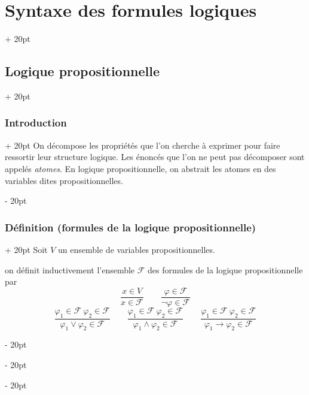 \documentclass[a4paper, 12pt, twoside]{article}
\newcommand{\ind}[1][20pt]{\advance\leftskip + #1}
\newcommand{\deind}[1][20pt]{\advance\leftskip - #1}
\newenvironment{indt}[2][20pt]{#2 \par \ind[#1]}{\par \deind} %
\begin{document}
    \begin{indt}{\section{Syntaxe des formules logiques}}
        
        \begin{indt}{\subsection{Logique propositionnelle}}
            \begin{indt}{\subsubsection{Introduction}}
                On décompose les propriétés que l'on cherche à exprimer pour faire ressortir leur structure logique. Les énoncés que l'on ne peut pas décomposer sont appelés \textit{atomes}. En logique propositionnelle, on abstrait les atomes en des variables dites propositionnelles.
            \end{indt}
            
            \vspace{12pt}
            
            \begin{indt}{\subsubsection{Définition (formules de la logique propositionnelle)}}
                Soit $V$ un ensemble de variables propositionnelles.
                
                on définit inductivement l'ensemble $\mathcal F$ des formules de la logique propositionnelle par
                    \[
                        \dfrac{x \in V}{x \in \mathcal F}
                        \qquad
                        \dfrac{\varphi \in \mathcal F}{\neg \varphi \in \mathcal F}
                    \]
                    \[
                        \dfrac{\varphi_1 \in \mathcal F\ \varphi_2 \in \mathcal F}{\varphi_1 \vee \varphi_2 \in \mathcal F}
                        \qquad
                        \dfrac{\varphi_1 \in \mathcal F\ \varphi_2 \in \mathcal F}{\varphi_1 \wedge \varphi_2 \in \mathcal F}
                        \qquad
                        \dfrac{\varphi_1 \in \mathcal F\ \varphi_2 \in \mathcal F}{\varphi_1 \rightarrow \varphi_2 \in \mathcal F}
                    \]
                

\end{indt}
\end{indt}
\end{indt}
\end{document}
